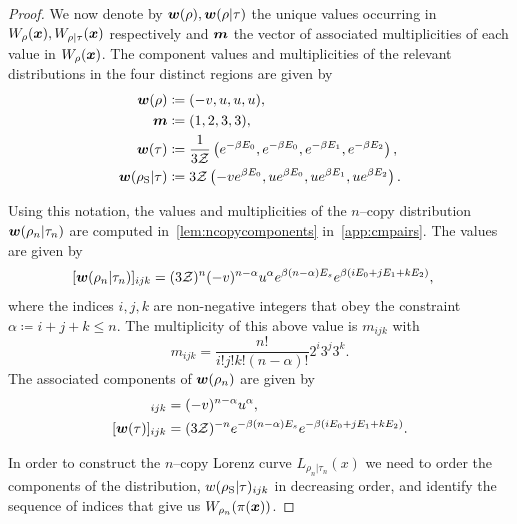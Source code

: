 \documentclass[pra,
aps,
twocolumn,
superscriptaddress,
groupedaddress,
nofootinbib,
reprint
]{revtex4-1}
\begin{document}
\begin{proof}
We now denote by $\boldsymbol{w}(\rho), \boldsymbol{w}(\rho|\tau)$ the unique values occurring in $W_\rho(\boldsymbol{x}), W_{\rho|\tau}(\boldsymbol{x})$ respectively and $\bm{m}$ the vector of associated multiplicities of each value in $W_\rho(\boldsymbol{x})$. The component values and multiplicities of the relevant distributions in the four distinct regions are given by
\begin{align}
	\boldsymbol{w}(\rho) &\coloneqq (-v, u, u, u), \\
		\bm{m} &\coloneqq (1,2,3,3), \\
	\boldsymbol{w}(\tau) &\coloneqq \frac{1}{3\mathcal{Z}} \left( e^{-\beta E_0}, e^{-\beta E_0}, e^{-\beta E_1}, e^{-\beta E_2} \right), \\
	\boldsymbol{w}(\rho_{\rm{S}} | \tau) &\coloneqq 3\mathcal{Z} \left( -v e^{\beta E_0}, u e^{\beta E_0}, u e^{\beta E_1}, u e^{\beta E_2} \right). \label{eq:bmw_rescaled}
\end{align}

Using this notation, the values and multiplicities of the $n$--copy distribution $\bm{w}(\rho_n |\tau_n)$ are computed in~\cref{lem:ncopycomponents} in~\cref{app:cmpairs}. The values are given by 
\begin{align}\label{eq:ncopy_w_rescaled}
	[\boldsymbol{w}(\rho_n | \tau_n)]_{ijk} &= (3\mathcal{Z})^{n} (-v)^{n-\alpha} u^{\alpha} e^{\beta (n-\alpha)E_s} e^{\beta ( i E_0 + j E_1 + k E_2 )},
\end{align}
where the indices $i,j,k$ are non-negative integers that obey the constraint $\alpha \coloneqq i+j+k \leq n$.
The multiplicity of this above value is $m_{ijk}$ with
\begin{equation}
	m_{ijk} = \frac{n!}{i!j!k!(n-\alpha)!} 2^i 3^j 3^k.
\end{equation}
The associated components of $\boldsymbol{w}(\rho_n)$ are given by
\begin{align}
	[\w(\rho_n)]_{ijk} &= (-v)^{n-\alpha} u^{\alpha}, \label{eq:ncopy_wrho}\\
	[\w(\tau)]_{ijk} &= (3\Z)^{-n} e^{-\beta (n-\alpha)E_s} e^{-\beta ( i E_0 + j E_1 + k E_2 )}. \label{eq:ncopy_wsigma}
\end{align}

In order to construct the $n$--copy Lorenz curve $L_{\rho_n|\tau_n}(x)$ we need to order the components of the distribution, $w(\rho_{\rm{S}} | \tau)_{ijk}$ in decreasing order, and identify the sequence of indices that give us $W_{\rho_n}(\pi(\boldsymbol{x}))$.


\end{proof}
\end{document}
